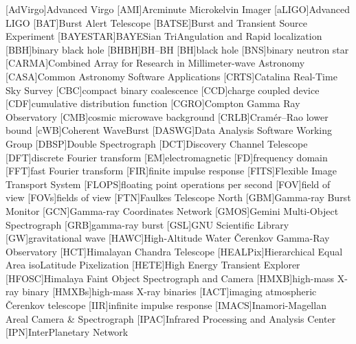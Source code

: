 \begin{acronym}
[AdVirgo]{Advanced Virgo}
[AMI]{Arcminute Microkelvin Imager}
[aLIGO]{Advanced \acs{LIGO}}
[BAT]{Burst Alert Telescope}
[BATSE]{Burst and Transient Source Experiment}
[BAYESTAR]{BAYESian TriAngulation and Rapid localization}
[BBH]{binary black hole}
[BHBH]{\acl{BH}\nobreakdashes--\acl{BH}}
[BH]{black hole}
[BNS]{binary neutron star}
[CARMA]{Combined Array for Research in Millimeter\nobreakdashes-wave Astronomy}
[CASA]{Common Astronomy Software Applications}
[CRTS]{Catalina Real-Time Sky Survey}
[CBC]{compact binary coalescence}
[CCD]{charge coupled device}
[CDF]{cumulative distribution function}
[CGRO]{Compton Gamma Ray Observatory}
[CMB]{cosmic microwave background}
[CRLB]{Cram\'{e}r\nobreakdashes--Rao lower bound}
[\textup{c}WB]{Coherent WaveBurst}
[DASWG]{Data Analysis Software Working Group}
[DBSP]{Double Spectrograph}
[DCT]{Discovery Channel Telescope}
[DFT]{discrete Fourier transform}
[EM]{electromagnetic}
[FD]{frequency domain}
[FFT]{fast Fourier transform}
[FIR]{finite impulse response}
[FITS]{Flexible Image Transport System}
[FLOPS]{floating point operations per second}
[FOV]{field of view}
[FOVs]{fields of view}
[FTN]{Faulkes Telescope North}
[GBM]{Gamma-ray Burst Monitor}
[GCN]{Gamma-ray Coordinates Network}
[GMOS]{Gemini Multi-Object Spectrograph}
[GRB]{gamma-ray burst}
[GSL]{GNU Scientific Library}
[GW]{gravitational wave}
[HAWC]{High\nobreakdashes-Altitude Water \v{C}erenkov Gamma\nobreakdashes-Ray Observatory}
[HCT]{Himalayan Chandra Telescope}
[HEALP\textup{ix}]{Hierarchical Equal Area isoLatitude Pixelization}
[HETE]{High Energy Transient Explorer}
[HFOSC]{Himalaya Faint Object Spectrograph and Camera}
[HMXB]{high\nobreakdashes-mass X\nobreakdashes-ray binary}
[HMXBs]{high\nobreakdashes-mass X\nobreakdashes-ray binaries}
[IACT]{imaging atmospheric \v{C}erenkov telescope}
[IIR]{infinite impulse response}
[IMACS]{Inamori-Magellan Areal Camera \& Spectrograph}
[IPAC]{Infrared Processing and Analysis Center}
[IPN]{InterPlanetary Network}

\end{acronym}
